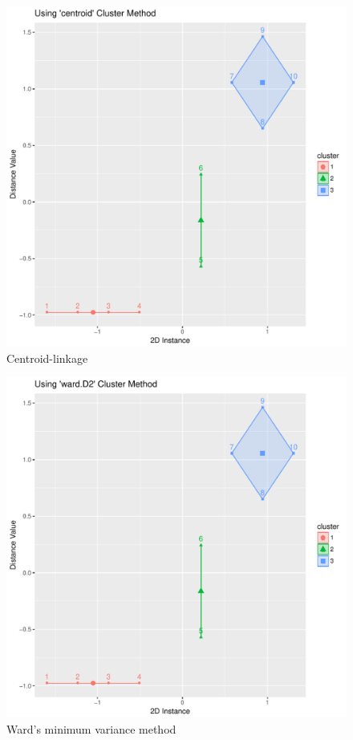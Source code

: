 \documentclass[letterpaper,11pt]{article}
\begin{document}
\begin{figure}[h]
\centering
\includegraphics[scale=0.45]{centroid.pdf}
\caption{Centroid-linkage}
\label{fig:4}
\end{figure}

\begin{figure}[h]
\centering
\includegraphics[scale=0.45]{ward.D2.pdf}
\caption{Ward's minimum variance method}
\label{fig:5}
\end{figure}
\end{document}
